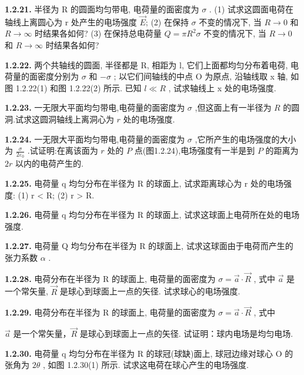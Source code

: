 \newpage
\textbf{1.2.21.} 半径为 R 的圆面均匀带电, 电荷量的面密度为 $\sigma$ . (1) 试求这圆面电荷在轴线上离圆心为 r 处产生的电场强度 $\vec{E}$; (2) 在保持 $\sigma$ 不变的情况下, 当 $R \to 0$ 和 $R \to \infty$ 时结果各如何? (3) 在保持总电荷量 $Q = \pi R^{2} \sigma$ 不变的情况下, 当 $R \to 0$ 和 $R \to \infty$ 时结果各如何?

\vfill

\textbf{1.2.22.} 两个共轴线的圆面, 半径都是 R, 相距为 l, 它们上面都均匀分布着电荷, 电荷量的面密度分别为 $\sigma$ 和 $-\sigma$ ; 以它们间轴线的中点 O 为原点, 沿轴线取 x 轴, 如图 1.2.22(1) 和图 1.2.22(2) 所示. 已知 $l \ll R$ , 试求轴线上 x 处的电场强度.

\vfill

\newpage
\textbf{1.2.23.} 一无限大平面均匀带电,电荷量的面密度为 $\sigma$ ,但这面上有一半径为 $R$ 的圆洞.试求这圆洞轴线上离洞心为 $r$ 处的电场强度.

\vfill

\textbf{1.2.24.} 一无限大平面均匀带电,电荷量的面密度为 $\sigma$ ,它所产生的电场强度的大小为 $\displaystyle \frac{\sigma}{2\varepsilon_0}$ .试证明:在离该面为 $r$ 处的 $P$ 点(图1.2.24),电场强度有一半是到 $P$ 的距离为 $2r$ 以内的电荷产生的.

\vfill

\newpage
\textbf{1.2.25.} 电荷量 q 均匀分布在半径为 R 的球面上, 试求距离球心为 r 处的电场强度: (1) r < R; (2) r > R.

\vfill

\textbf{1.2.26.} 电荷量 q 均匀分布在半径为 R 的球面上, 试求这球面上电荷所在处的电场强度.

\vfill

\newpage
\textbf{1.2.27.} 电荷量 Q 均匀分布在半径为 R 的球面上, 试求这球面由于电荷而产生的张力系数 $\alpha$ .

\vfill

\textbf{1.2.28.} 电荷分布在半径为 R 的球面上, 电荷量的面密度为 $\sigma = \vec{a} \cdot \vec{R}$ , 式中 $\vec{a}$ 是一个常矢量, $\vec{R}$ 是球心到球面上一点的矢径. 试求球心的电场强度.

\vfill

\newpage
\textbf{1.2.29.} 电荷分布在半径为 R 的球面上, 电荷量的面密度为 $\sigma = \vec{a} \cdot \vec{R}$ , 式中


$\vec{a}$ 是一个常矢量，$\vec{R}$ 是球心到球面上一点的矢径. 试证明：球内电场是均匀电场.

\vfill

\textbf{1.2.30.} 电荷量 q 均匀分布在半径为 R 的球冠(球缺)面上, 球冠边缘对球心 O 的张角为 $2\theta$ , 如图 1.2.30(1) 所示. 试求这电荷在球心产生的电场强度.



